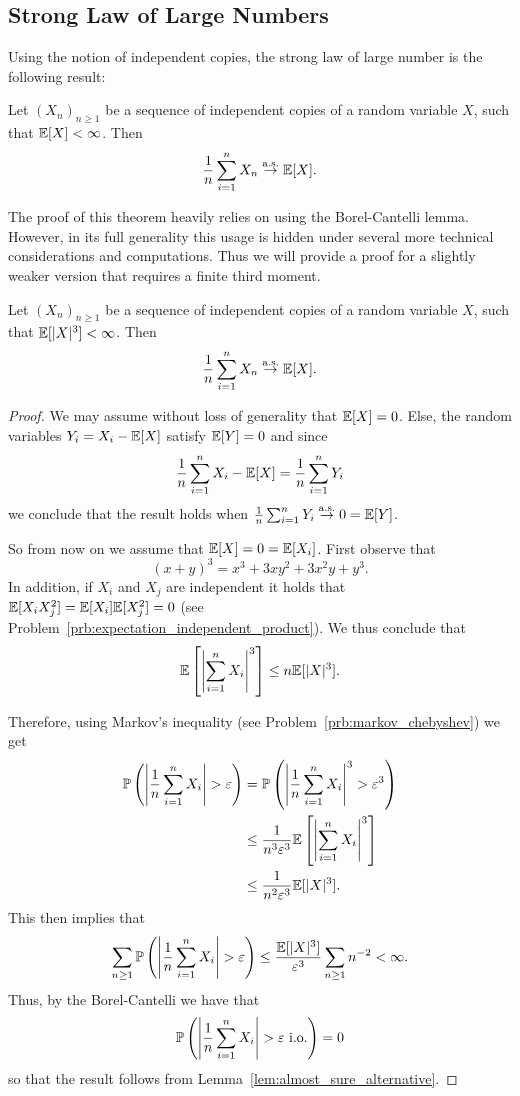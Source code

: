 \subsection{Strong Law of Large Numbers}

Using the notion of independent copies, the strong law of large number is the following result:

\begin{theorem}\label{thm:slln}
Let $(X_n)_{n \ge 1}$ be a sequence of independent copies of a random variable $X$, such that $\mathbb E[X] < \infty$. Then
\[
	\frac{1}{n} \sum_{i = 1}^n X_n \stackrel{\mathrm{a.s.}}{\rightarrow} \mathbb E[X].
\]
\end{theorem}

The proof of this theorem heavily relies on using the Borel-Cantelli lemma. However, in its full generality this usage is hidden under several more technical considerations and computations. Thus we will provide a proof for a slightly weaker version that requires a finite third moment.

\begin{theorem}\label{thm:slln_weaker}
Let $(X_n)_{n \ge 1}$ be a sequence of independent copies of a random variable $X$, such that $\mathbb E[|X|^3] < \infty$. Then
\[
	\frac{1}{n} \sum_{i = 1}^n X_n \stackrel{\mathrm{a.s.}}{\rightarrow} \mathbb E[X].
\]
\end{theorem}

\begin{proof}
We may assume without loss of generality that $\mathbb E[X] = 0$. Else, the random variables $Y_i = X_i - \mathbb E[X]$ satisfy $\mathbb E[Y] = 0$ and since
\[
	\frac{1}{n} \sum_{i = 1}^n X_i - \mathbb E[X] = \frac{1}{n} \sum_{i = 1}^n Y_i
\]
we conclude that the result holds when $\frac{1}{n} \sum_{i = 1}^n Y_i \stackrel{\mathrm{a.s.}}{\rightarrow} 0 = \mathbb E[Y]$.

So from now on we assume that $\mathbb E[X] = 0 = \mathbb E[X_i]$. First observe that
\[
	(x+y)^3 = x^3 +3xy^2 + 3x^2 y + y^3.
\]
In addition, if $X_i$ and $X_j$ are independent it holds that $\mathbb E[X_i X_j^2] = \mathbb E[X_i] \mathbb E[X_j^2] = 0$ (see Problem~\ref{prb:expectation_independent_product}). We thus conclude that
\[
	\mathbb E\left[\left|\sum_{i = 1}^n X_i\right|^3\right] \le n \mathbb E[|X|^3].
\]

Therefore, using Markov's inequality (see Problem~\ref{prb:markov_chebyshev}) we get
\begin{align*}
	\mathbb P\left(\left|\frac{1}{n} \sum_{i = 1}^n X_i\right| > \varepsilon\right)
	&= \mathbb P\left(\left|\frac{1}{n} \sum_{i = 1}^n X_i\right|^3 > \varepsilon^3\right)\\
	&\le \frac{1}{n^3 \varepsilon^3} \mathbb E\left[\left|\sum_{i = 1}^n X_i\right|^3\right]\\
	&\le \frac{1}{n^2 \varepsilon^3} \mathbb E[|X|^3].
\end{align*}
This then implies that
\[
	\sum_{n \ge 1} \mathbb P\left(\left|\frac{1}{n} \sum_{i = 1}^n X_i\right| > \varepsilon\right) 
	\le \frac{\mathbb E[|X|^3]}{\varepsilon^3}\sum_{n \ge 1} n^{-2} < \infty.
\]
Thus, by the Borel-Cantelli we have that
\[
	\mathbb P\left(\left|\frac{1}{n} \sum_{i = 1}^n X_i\right| > \varepsilon \text{ i.o.}\right) = 0 
\]
so that the result follows from Lemma~\ref{lem:almost_sure_alternative}.
\end{proof}

